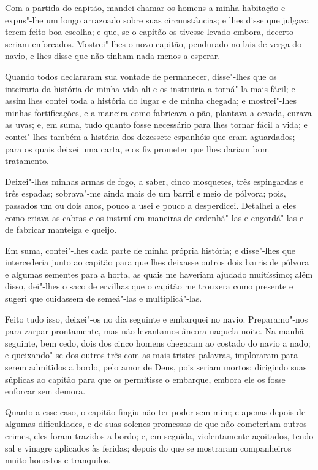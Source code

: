 Com a partida do capitão, mandei chamar os homens a minha habitação e
expus"-lhe um longo arrazoado sobre suas circunstâncias; e lhes disse que
julgava terem feito boa escolha; e que, se o capitão os tivesse levado
embora, decerto seriam enforcados. Mostrei"-lhes o novo capitão,
pendurado no lais de verga do navio, e lhes disse que não tinham nada
menos a esperar.

Quando todos declararam sua vontade de permanecer, disse"-lhes que os
inteiraria da história de minha vida ali e os instruiria a torná"-la mais
fácil; e assim lhes contei toda a história do lugar e de minha chegada;
e mostrei"-lhes minhas fortificações, e a maneira como fabricava o pão,
plantava a cevada, curava as uvas; e, em suma, tudo quanto fosse
necessário para lhes tornar fácil a vida; e contei"-lhes também a
história dos dezessete espanhóis que eram aguardados; para os quais
deixei uma carta, e os fiz prometer que lhes dariam bom tratamento.

Deixei"-lhes minhas armas de fogo, a saber, cinco mosquetes, três
espingardas e três espadas; sobrava"-me ainda mais de um barril e meio de
pólvora; pois, passados um ou dois anos, pouco a usei e pouco a
desperdicei. Detalhei a eles como criava as cabras e os instruí em
maneiras de ordenhá"-las e engordá"-las e de fabricar manteiga e queijo.

Em suma, contei"-lhes cada parte de minha própria história; e disse"-lhes
que intercederia junto ao capitão para que lhes deixasse outros dois
barris de pólvora e algumas sementes para a horta, as quais me haveriam
ajudado muitíssimo; além disso, dei"-lhes o saco de ervilhas que o
capitão me trouxera como presente e sugeri que cuidassem de semeá"-las e
multiplicá"-las.

Feito tudo isso, deixei"-os no dia seguinte e embarquei no navio.
Preparamo"-nos para zarpar prontamente, mas não levantamos âncora naquela
noite. Na manhã seguinte, bem cedo, dois dos cinco homens chegaram ao
costado do navio a nado; e queixando"-se dos outros três com as mais
tristes palavras, imploraram para serem admitidos a bordo, pelo amor de
Deus, pois seriam mortos; dirigindo suas súplicas ao capitão para que os
permitisse o embarque, embora ele os fosse enforcar sem demora.

Quanto a esse caso, o capitão fingiu não ter poder sem mim; e apenas
depois de algumas dificuldades, e de suas solenes promessas de que não
cometeriam outros crimes, eles foram trazidos a bordo; e, em seguida,
violentamente açoitados, tendo sal e vinagre aplicados às feridas;
depois do que se mostraram companheiros muito honestos e tranquilos.

